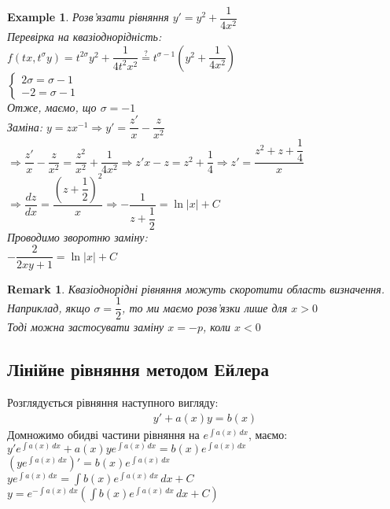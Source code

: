 \documentclass[a4paper, 10pt]{article}
\theoremstyle{theoremdd}
\theoremstyle{theoremdd}
\theoremstyle{theoremdd}
\theoremstyle{theoremdd}
\newtheorem{example}[theorem]{Example}
\theoremstyle{theoremdd}
\theoremstyle{theoremdd}
\newtheorem{remark}[theorem]{Remark}
\theoremstyle{theoremdd}
\theoremstyle{theoremdd}
\begin{document}
\begin{example}
 Розв'язати рівняння $y' = y^2 + \dfrac{1}{4x^2}$\\
Перевірка на квазіоднорідність:\\
$f(tx, t^\sigma y) = t^{2 \sigma} y^2 + \dfrac{1}{4t^2 x^2} \overset{?}{=} t^{\sigma -1} \left(y^2 + \dfrac{1}{4x^2} \right)$\\
$\begin{cases}
2\sigma = \sigma - 1 \\
-2 = \sigma - 1
\end{cases}
$\\
Отже, маємо, що $\sigma = -1$\\
Заміна: $y = zx^{-1} \Rightarrow y' = \dfrac{z'}{x} - \dfrac{z}{x^2}$\\
$\Rightarrow \dfrac{z'}{x} - \dfrac{z}{x^2} = \dfrac{z^2}{x^2} + \dfrac{1}{4x^2}
\Rightarrow z'x - z = z^2 + \dfrac{1}{4} \Rightarrow z' = \dfrac{z^2+z+\dfrac{1}{4}}{x}$\\
$\Rightarrow \dfrac{dz}{dx} = \dfrac{\left( z+\dfrac{1}{2} \right)^2}{x} \Rightarrow -\dfrac{1}{z + \dfrac{1}{2}} = \ln |x| + C$\\
Проводимо зворотню заміну:\\
$-\dfrac{2}{2xy+1} = \ln |x| + C$
\end{example}

\begin{remark}
 Квазіоднорідні рівняння можуть скоротити область визначення. Наприклад, якщо $\sigma = \dfrac{1}{2}$, то ми маємо розв'язки лише для $x > 0$\\
Тоді можна застосувати заміну $x = -p$, коли $x < 0$
\end{remark}

\subsection{Лінійне рівняння методом Ейлера}
Розглядується рівняння наступного вигляду:
\begin{align*}
y' + a(x)y = b(x)
\end{align*}
Домножимо обидві частини рівняння на $e^{\int a(x)\,dx}$, маємо:\\
$y' e^{\int a(x)\,dx} + a(x)y e^{\int a(x)\,dx} = b(x)e^{\int a(x)\,dx}$\\
$\left( y e^{\int a(x)\,dx} \right)' = b(x) e^{\int a(x)\,dx}$\\
$y e^{\int a(x)\,dx} = \displaystyle \int b(x) e^{\int a(x)\,dx} \,dx + C$\\
$y = e^{-\int a(x)\,dx} \left(\displaystyle \int b(x) e^{\int a(x)\,dx} \,dx + C \right)$
\end{document}
